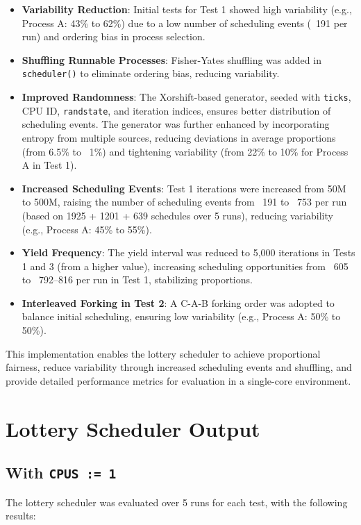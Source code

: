 \documentclass{article}
\begin{document}
\begin{itemize}
    \item \textbf{Variability Reduction}: Initial tests for Test 1 showed high variability (e.g., Process A: 43\% to 62\%) due to a low number of scheduling events (~191 per run) and ordering bias in process selection.
    \item \textbf{Shuffling Runnable Processes}: Fisher-Yates shuffling was added in \texttt{scheduler()} to eliminate ordering bias, reducing variability.
    \item \textbf{Improved Randomness}: The Xorshift-based generator, seeded with \texttt{ticks}, CPU ID, \texttt{randstate}, and iteration indices, ensures better distribution of scheduling events. The generator was further enhanced by incorporating entropy from multiple sources, reducing deviations in average proportions (from 6.5\% to ~1\%) and tightening variability (from 22\% to 10\% for Process A in Test 1).
    \item \textbf{Increased Scheduling Events}: Test 1 iterations were increased from 50M to 500M, raising the number of scheduling events from ~191 to ~753 per run (based on 1925 + 1201 + 639 schedules over 5 runs), reducing variability (e.g., Process A: 45\% to 55\%).
    \item \textbf{Yield Frequency}: The yield interval was reduced to 5,000 iterations in Tests 1 and 3 (from a higher value), increasing scheduling opportunities from ~605 to ~792–816 per run in Test 1, stabilizing proportions.
    \item \textbf{Interleaved Forking in Test 2}: A C-A-B forking order was adopted to balance initial scheduling, ensuring low variability (e.g., Process A: 50\% to 50\%).
\end{itemize}

This implementation enables the lottery scheduler to achieve proportional fairness, reduce variability through increased scheduling events and shuffling, and provide detailed performance metrics for evaluation in a single-core environment.

\section{Lottery Scheduler Output}
\subsection{With \texttt{CPUS := 1}}
The lottery scheduler was evaluated over 5 runs for each test, with the following results:
\end{document}
